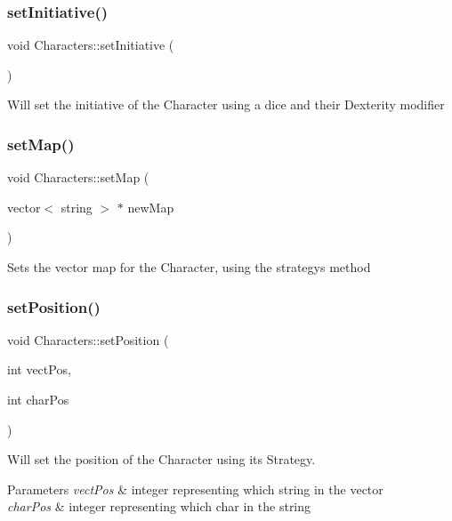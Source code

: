 \subsubsection{\texorpdfstring{set\+Initiative()}{setInitiative()}}
{\footnotesize\ttfamily void Characters\+::set\+Initiative (\begin{DoxyParamCaption}{ }\end{DoxyParamCaption})}

Will set the initiative of the Character using a dice and their Dexterity modifier \hypertarget{class_characters_a7ea2bd80b72476d35173691d31e80727}{}\label{class_characters_a7ea2bd80b72476d35173691d31e80727} 
\subsubsection{\texorpdfstring{set\+Map()}{setMap()}}
{\footnotesize\ttfamily void Characters\+::set\+Map (\begin{DoxyParamCaption}\item[{vector$<$ string $>$ $\ast$}]{new\+Map }\end{DoxyParamCaption})\hspace{0.3cm}{\ttfamily [virtual]}}

Sets the vector map for the Character, using the strategy\textquotesingle{}s method \hypertarget{class_characters_a717e24c7c3c4cb1d78e5814a3f0df0db}{}\label{class_characters_a717e24c7c3c4cb1d78e5814a3f0df0db} 
\subsubsection{\texorpdfstring{set\+Position()}{setPosition()}}
{\footnotesize\ttfamily void Characters\+::set\+Position (\begin{DoxyParamCaption}\item[{int}]{vect\+Pos,  }\item[{int}]{char\+Pos }\end{DoxyParamCaption})}

Will set the position of the Character using its Strategy. 
\begin{DoxyParams}{Parameters}
{\em vect\+Pos} & integer representing which string in the vector \\
\hline
{\em char\+Pos} & integer representing which char in the string \\
\hline
\end{DoxyParams}
\hypertarget{class_characters_a8e8a0b81e4be9eb6a1c75a5ae5d8bb27}{}\label{class_characters_a8e8a0b81e4be9eb6a1c75a5ae5d8bb27} 
